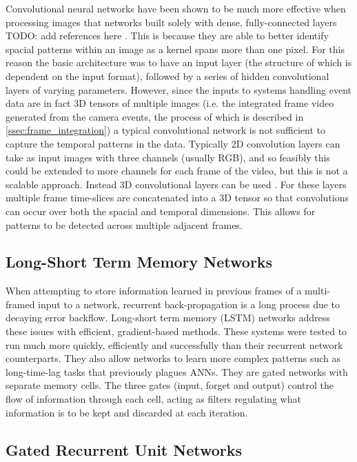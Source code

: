 Convolutional neural networks have been shown to be much more effective when processing images that networks built solely with dense, fully-connected layers \color{red} TODO: add references here \color{black}. This is because they are able to better identify spacial patterns within an image as a kernel spans more than one pixel. For this reason the basic architecture was to have an input layer (the structure of which is dependent on the input format), followed by a series of hidden convolutional layers of varying parameters.
However, since the inputs to systems handling event data are in fact 3D tensors of multiple images (i.e. the integrated frame video generated from the camera events, the process of which is described in \cref{ssec:frame_integration}) a typical convolutional network is not sufficient to capture the temporal patterns in the data. Typically 2D convolution layers can take as input images with three channels (usually RGB), and so feasibly this could be extended to more channels for each frame of the video, but this is not a scalable approach. Instead 3D convolutional layers can be used \cite{3DConv}. For these layers multiple frame time-slices are concatenated into a 3D tensor so that convolutions can occur over both the spacial and temporal dimensions. This allows for patterns to be detected across multiple adjacent frames.

\subsection{Long-Short Term Memory Networks}

When attempting to store information learned in previous frames of a multi-framed input to a network, recurrent back-propagation is a long process due to decaying error backflow. Long-short term memory (LSTM) networks\cite{LSTM} address these issues with efficient, gradient-based methods. These systems were tested to run much more quickly, efficiently and successfully than their recurrent network counterparts. They also allow networks to learn more complex patterns such as long-time-lag tasks that previously plagues ANNs. They are gated networks with separate memory cells. The three gates (input, forget and output) control the flow of information through each cell, acting as filters regulating what information is to be kept and discarded at each iteration.

\subsection{Gated Recurrent Unit Networks}

